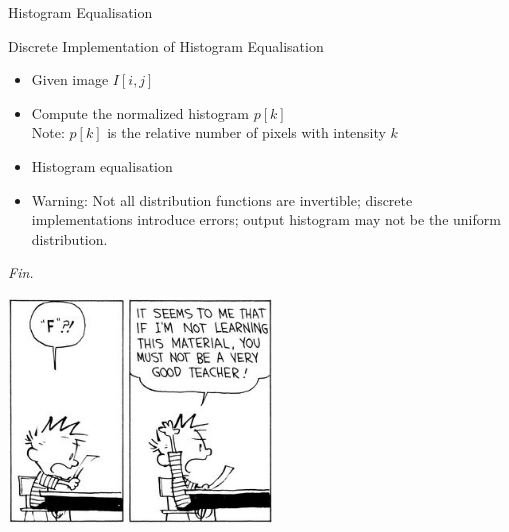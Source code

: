 \begin{frame}{Histogram Equalisation}
\end{frame}

\begin{frame}{Discrete Implementation of Histogram Equalisation}
    \begin{itemize}
    \itemsep=1em
        \item<1-> Given image $I[i,j]$
        \item<1-> Compute the normalized histogram $p[k]$\\
        Note: $p[k]$ is the relative number of pixels with intensity $k$
        \item<2-> Histogram equalisation
        \item<3-> \alert{Warning: Not all distribution functions are invertible; discrete implementations introduce errors; output histogram may not be the uniform distribution.}
    \end{itemize}
\end{frame}

\begin{frame}{}
  \centering
  \LARGE\emph{Fin.}
  \vspace*{1em}

  \includegraphics[width=2.75in]{./figures/calvin-hobbes-01.jpeg}
\end{frame}